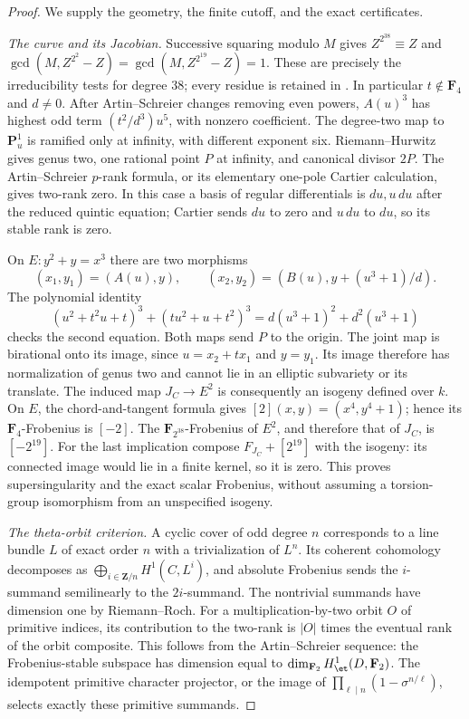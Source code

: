 \begin{proof}
We supply the geometry, the finite cutoff, and the exact certificates.

\emph{The curve and its Jacobian.}
Successive squaring modulo $M$ gives
$Z^{2^{38}}\equiv Z$ and
$\gcd(M,Z^{2^2}-Z)=\gcd(M,Z^{2^{19}}-Z)=1$.
These are precisely the irreducibility tests for degree 38; every
residue is retained in .
In particular $t\notin\mathbf F_4$ and $d\ne0$.
After Artin--Schreier changes removing even powers, $A(u)^3$ has
highest odd term $(t^2/d^3)u^5$, with nonzero coefficient.
The degree-two map to $\mathbf P^1_u$ is ramified only at infinity,
with different exponent six. Riemann--Hurwitz gives genus two,
one rational point $P$ at infinity, and canonical divisor $2P$.
The Artin--Schreier $p$-rank formula, or its elementary one-pole
Cartier calculation, gives two-rank zero. In this case a basis of
regular differentials is $du,u\,du$ after the reduced quintic
equation; Cartier sends $du$ to zero and $u\,du$ to $du$, so its
stable rank is zero.

On $E:y^2+y=x^3$ there are two morphisms
\[
 (x_1,y_1)=(A(u),y),\qquad
 (x_2,y_2)=(B(u),y+(u^3+1)/d).
\]
The polynomial identity
\[
 (u^2+t^2u+t)^3+(tu^2+u+t^2)^3
       =d(u^3+1)^2+d^2(u^3+1)
\]
checks the second equation. Both maps send $P$ to the origin.
The joint map is birational onto its image, since
$u=x_2+t x_1$ and $y=y_1$. Its image therefore has normalization
of genus two and cannot lie in an elliptic subvariety or its
translate. The induced map $J_C\to E^2$ is consequently an isogeny
defined over $k$. On $E$, the chord-and-tangent formula gives
$[2](x,y)=(x^4,y^4+1)$; hence its $\mathbf F_4$-Frobenius is $[-2]$.
The $\mathbf F_{2^{38}}$-Frobenius of $E^2$, and therefore that of
$J_C$, is $[-2^{19}]$. For the last implication compose
$F_{J_C}+[2^{19}]$ with the isogeny: its connected image would lie
in a finite kernel, so it is zero. This proves supersingularity
and the exact scalar Frobenius, without assuming a torsion-group
isomorphism from an unspecified isogeny.

\emph{The theta-orbit criterion.}
A cyclic cover of odd degree $n$ corresponds to a line bundle $L$
of exact order $n$ with a trivialization of $L^n$. Its coherent
cohomology decomposes as
$\bigoplus_{i\in\mathbf Z/n}H^1(C,L^i)$, and absolute Frobenius
sends the $i$-summand semilinearly to the $2i$-summand. The
nontrivial summands have dimension one by Riemann--Roch.
For a multiplication-by-two orbit $O$ of primitive indices, its
contribution to the two-rank is $|O|$ times the eventual rank of
the orbit composite. This follows from the Artin--Schreier
sequence: the Frobenius-stable subspace has dimension equal to
$\dim_{\mathbf F_2}H^1_{\et}(D,\mathbf F_2)$. The idempotent
primitive character projector, or the image of
$\prod_{\ell\mid n}(1-\sigma^{n/\ell})$, selects exactly these
primitive summands.


\end{proof}
